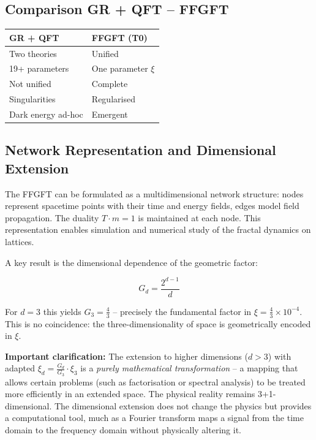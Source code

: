 	\subsection*{Comparison GR + QFT – FFGFT}
	
	\begin{center}
		\begin{tabular}{p{}p{}}
			\textbf{GR + QFT} & \textbf{FFGFT (T0)} \\
			\hline
			Two theories & Unified \\
			19+ parameters & One parameter \(\xi\) \\
			Not unified & Complete \\
			Singularities & Regularised \\
			Dark energy ad-hoc & Emergent \\
		\end{tabular}
	\end{center}
	
	\subsection*{Network Representation and Dimensional Extension}
	
	The FFGFT can be formulated as a multidimensional network structure: nodes represent spacetime points with their time and energy fields, edges model field propagation. The duality $T \cdot m = 1$ is maintained at each node. This representation enables simulation and numerical study of the fractal dynamics on lattices.
	
	A key result is the dimensional dependence of the geometric factor:
	
	\begin{equation}
		G_d = \frac{2^{d-1}}{d}
	\end{equation}
	
	For $d = 3$ this yields $G_3 = \frac{4}{3}$ -- precisely the fundamental factor in $\xi = \frac{4}{3} \times 10^{-4}$. This is no coincidence: the three-dimensionality of space is geometrically encoded in $\xi$.
	
	\textbf{Important clarification:} The extension to higher dimensions ($d > 3$) with adapted $\xi_d = \frac{G_d}{G_3} \cdot \xi_3$ is a \textit{purely mathematical transformation} -- a mapping that allows certain problems (such as factorisation or spectral analysis) to be treated more efficiently in an extended space. The physical reality remains 3+1-dimensional. The dimensional extension does not change the physics but provides a computational tool, much as a Fourier transform maps a signal from the time domain to the frequency domain without physically altering it.
	
